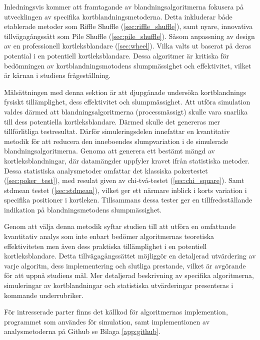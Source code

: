 \documentclass[swedish,a4paper]{article}
\begin{document}
Inledningsvis kommer att framtagande av blandningsalgoritmerna fokusera på
utvecklingen av specifika kortblandningsmetoderna. Detta inkluderar både
etablerade metoder som Riffle Shuffle (\ref{sec:riffle_shuffle}), samt nyare,
innovativa tillvägagångssätt som Pile Shuffle (\ref{sec:pile_shuffle}). Såsom
anpassning av design av en professionell kortleksblandare (\ref{sec:wheel}).
Vilka valts ut baserat på deras potential i en potentiell kortleksblandare.
Dessa algoritmer är kritiska för bedömningen av kortblandningsmotodens
slumpmässighet och effektivitet, vilket är kärnan i studiens frågeställning. 

Målsättningen med denna sektion är att djupgånade undersöka kortblandnings
fysiskt tillämplighet, dess effektivitet och slumpmässighet. Att utföra 
simulation valdes därmed att blandningsalgoritmerna
(processmässigt) skulle vara snarlika till dess potentiella kortleks\-blandare.
Därmed skulle det genereras mer tillförlitliga testresultat. Därför simuleringsdelen
innefattar en kvantitativ metodik för att reducera den inneboendes
slumpvariation i de simulerade blandningsalgoritmerna. Genoma att generera ett bestämt
mängd av kortleksblandningar, där datamängder uppfyler kravet ifrån statistiska metoder. Dessa
statistiska  analysmetoder omfattar det klassiska pokertestet (\ref{sec:poker_test}), med
resulat given av chi-två-testet (\ref{sec:chi_square}). Samt \gls{stdmean} testet
(\ref{sec:stdmean}), vilket ger ett närmare inblick i korts variation i specifika
positioner i kortleken. Tillsammans dessa tester ger en tillfredsställande indikation på
blandningsmetodens slumpmässighet. 

Genom att välja denna metodik syftar studien till att utföra en omfattande
kvantitativ analys som inte enbart bedömer algoritmernas teoretiska
effektiviteten men även dess praktiska tillämplighet i en potentiell kortleks\-blandare.
Detta tillvägagångssättet möjliggör en detaljerad utvärdering av varje algoritm,
dess implementering och slutliga prestande, vilket är avgörande för att uppnå
studiens mål. Mer detaljerad beskrivning av specifika algoritmerna,
simuleringar av kortblandningar och statistiska utvärderingar presenteras i kommande 
underrubriker. 

För intresserade parter finns det källkod för algoritmernas implemention,
programmet som användes för simulation, samt implementionen av analysmetoderna
på Github se Bilaga \ref{app:github}.
\end{document}
